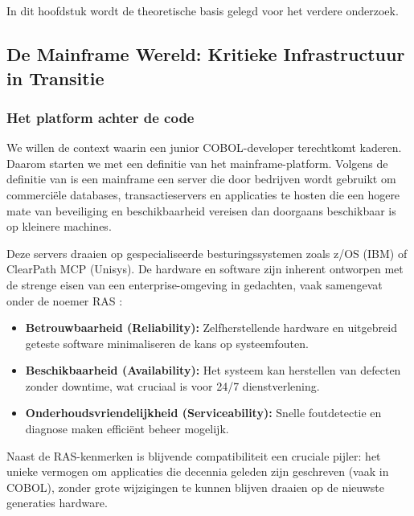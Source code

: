 \chapter{}%
\label{ch:stand-van-zaken}

In dit hoofdstuk wordt de theoretische basis gelegd voor het verdere onderzoek.

\section{De Mainframe Wereld: Kritieke Infrastructuur in Transitie}
\label{sec:mainframe-wereld}

\subsection{Het platform achter de code}

We willen de context waarin een junior COBOL-developer terechtkomt kaderen. Daarom starten we met een definitie van het mainframe-platform.
Volgens de definitie van \textcite{IBM2010} is een mainframe een server die door bedrijven wordt gebruikt om commerciële databases, transactieservers en applicaties te hosten die een hogere mate van beveiliging en beschikbaarheid vereisen dan doorgaans beschikbaar is op kleinere machines.

Deze servers draaien op gespecialiseerde besturingssystemen zoals z/OS (IBM) of ClearPath MCP (Unisys).
De hardware en software zijn inherent ontworpen met de strenge eisen van een enterprise-omgeving in gedachten, vaak samengevat onder de noemer RAS \autocite{Ebbers2011}:

\begin{itemize}
  \item \textbf{Betrouwbaarheid (Reliability):} Zelfherstellende hardware en uitgebreid geteste software minimaliseren de kans op systeemfouten.
  \item \textbf{Beschikbaarheid (Availability):} Het systeem kan herstellen van defecten zonder downtime, wat cruciaal is voor 24/7 dienstverlening.
  \item \textbf{Onderhoudsvriendelijkheid (Serviceability):} Snelle foutdetectie en diagnose maken efficiënt beheer mogelijk.
\end{itemize}

Naast de RAS-kenmerken is blijvende compatibiliteit een cruciale pijler: het unieke vermogen om applicaties die decennia geleden zijn geschreven (vaak in COBOL), zonder grote wijzigingen te kunnen blijven draaien op de nieuwste generaties hardware.

